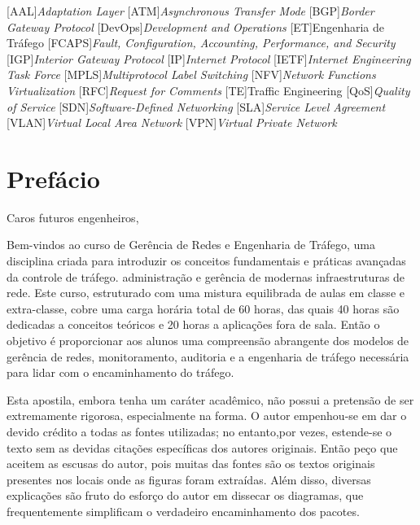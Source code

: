 \documentclass[article]{memoir}
\let\section\chapter    %
\begin{document}

\begin{acronym}
	\begin{footnotesize}
	[AAL]{\textit{Adaptation Layer}} 
	[ATM]{\textit{Asynchronous Transfer Mode}}
	[BGP]{\textit{Border Gateway Protocol}}
	[DevOps]{\textit{Development and Operations}}
	[ET]{Engenharia de Tráfego}
	[FCAPS]{\textit{Fault, Configuration, Accounting, Performance, and Security}}
	[IGP]{\textit{Interior Gateway Protocol}}
	[IP]{\textit{Internet Protocol}}
	[IETF]{\textit{Internet Engineering Task Force}}
	[MPLS]{\textit{Multiprotocol Label Switching}}
	[NFV]{\textit{Network Functions Virtualization}}
	[RFC]{\textit{Request for Comments}}
	[TE]{Traffic Engineering}
	[QoS]{\textit{Quality of Service}}
	[SDN]{\textit{Software-Defined Networking}}
	[SLA]{\textit{Service Level Agreement}}
	[VLAN]{\textit{Virtual Local Area Network}}
	[VPN]{\textit{Virtual Private Network}}
\end{footnotesize}
\end{acronym}

\section*{Prefácio}

Caros futuros engenheiros, 

Bem-vindos ao curso de Gerência de Redes e Engenharia de Tráfego, uma disciplina  criada para introduzir os conceitos fundamentais e práticas avançadas da controle de tráfego. administração e gerência de modernas infraestruturas de rede. Este curso, estruturado com uma mistura equilibrada de aulas em classe e extra-classe, cobre uma carga horária total de 60 horas, das quais 40 horas são dedicadas a conceitos teóricos e 20 horas a aplicações fora de sala. Então o objetivo é proporcionar aos alunos uma compreensão abrangente dos modelos de gerência de redes, monitoramento, auditoria e a engenharia de tráfego necessária para lidar com o encaminhamento do tráfego.


Esta apostila, embora tenha um caráter acadêmico, não possui a pretensão de ser extremamente rigorosa, especialmente na forma. O autor empenhou-se em dar o devido crédito a todas as fontes utilizadas; no entanto,por vezes, estende-se o texto sem as devidas citações específicas dos autores originais. Então peço que aceitem as escusas do autor, pois muitas das fontes são os textos originais presentes nos locais onde as figuras foram extraídas. Além disso, diversas explicações são fruto do esforço do autor em dissecar os diagramas, que frequentemente simplificam o verdadeiro encaminhamento dos pacotes.
\end{document}
